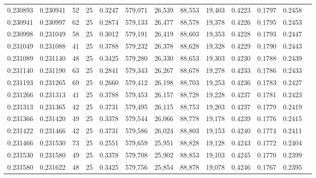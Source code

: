 \begin{tabular}{rrrrrrrrrrrrr}
0.230893 & 0.230941 &    52 &  25 &                                     0.3247 & 579,071 &  26,539 &  88,553 &  19,403 & 0.4223 & 0.1797 & 0.2458 \\
0.230941 & 0.230997 &    62 &  25 &                                     0.2874 & 579,133 &  26,477 &  88,578 &  19,378 & 0.4226 & 0.1795 & 0.2453 \\
0.230998 & 0.231049 &    58 &  25 &                                     0.3012 & 579,191 &  26,419 &  88,603 &  19,353 & 0.4228 & 0.1793 & 0.2447 \\
0.231049 & 0.231088 &    41 &  25 &                                     0.3788 & 579,232 &  26,378 &  88,628 &  19,328 & 0.4229 & 0.1790 & 0.2443 \\
0.231089 & 0.231140 &    48 &  25 &                                     0.3425 & 579,280 &  26,330 &  88,653 &  19,303 & 0.4230 & 0.1788 & 0.2439 \\
0.231140 & 0.231190 &    63 &  25 &                                     0.2841 & 579,343 &  26,267 &  88,678 &  19,278 & 0.4233 & 0.1786 & 0.2433 \\
0.231193 & 0.231265 &    69 &  25 &                                     0.2660 & 579,412 &  26,198 &  88,703 &  19,253 & 0.4236 & 0.1783 & 0.2427 \\
0.231266 & 0.231313 &    41 &  25 &                                     0.3788 & 579,453 &  26,157 &  88,728 &  19,228 & 0.4237 & 0.1781 & 0.2423 \\
0.231313 & 0.231365 &    42 &  25 &                                     0.3731 & 579,495 &  26,115 &  88,753 &  19,203 & 0.4237 & 0.1779 & 0.2419 \\
0.231366 & 0.231420 &    49 &  25 &                                     0.3378 & 579,544 &  26,066 &  88,778 &  19,178 & 0.4239 & 0.1776 & 0.2415 \\
0.231422 & 0.231466 &    42 &  25 &                                     0.3731 & 579,586 &  26,024 &  88,803 &  19,153 & 0.4240 & 0.1774 & 0.2411 \\
0.231466 & 0.231530 &    73 &  25 &                                     0.2551 & 579,659 &  25,951 &  88,828 &  19,128 & 0.4243 & 0.1772 & 0.2404 \\
0.231530 & 0.231580 &    49 &  25 &                                     0.3378 & 579,708 &  25,902 &  88,853 &  19,103 & 0.4245 & 0.1770 & 0.2399 \\
0.231580 & 0.231622 &    48 &  25 &                                     0.3425 & 579,756 &  25,854 &  88,878 &  19,078 & 0.4246 & 0.1767 & 0.2395 \\

\end{tabular}
